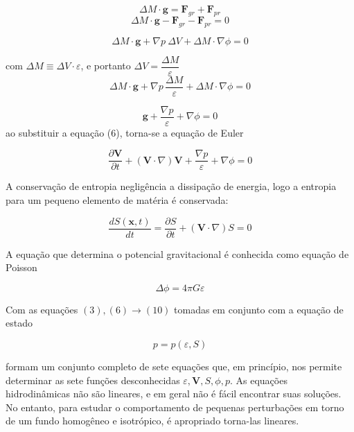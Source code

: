 \documentclass[a4paper,12pt]{article}
\begin{document}
\begin{equation}
	\Delta M \cdot \textbf{g} = \textbf{F}_{gr} + \textbf{F}_{pr}
\end{equation}
\newline
$$\Delta M \cdot \textbf{g} -  \textbf{F}_{gr} - \textbf{F}_{pr} = 0 $$

$$\Delta M \cdot \textbf{g}  + \nabla p \ \Delta V + \Delta M \cdot \nabla \phi=0 $$

com $\Delta M \equiv \Delta V \cdot \varepsilon$, e portanto $\Delta V = \dfrac{\Delta M}{\varepsilon}$
$$\Delta M \cdot \textbf{g}  + \nabla p \,\dfrac{\Delta M}{\varepsilon} + \Delta M \cdot \nabla \phi=0 $$

$$\textbf{g}  + \dfrac{\nabla p}{\varepsilon} + \nabla \phi=0 $$
ao substituir a equação (6), torna-se a equação de Euler

\begin{equation}
	\dfrac{\partial \textbf{V} }{\partial t} + (\textbf{V} \cdot \nabla ) \textbf{V} + \frac{\nabla p}{\varepsilon} + \nabla \phi =0
\end{equation}

A conservação de entropia negligência a dissipação de energia, logo a entropia para um pequeno elemento de matéria é conservada:

\begin{equation}
	\dfrac{dS(\textbf{x},t)}{dt} = \dfrac{\partial S}{\partial t} + ( \textbf{V} \cdot \nabla) S = 0
\end{equation}

A equação que determina o potencial gravitacional é conhecida como equação de Poisson

\begin{equation}
	\Delta\phi = 4\pi G\varepsilon
\end{equation}

Com as equações $(3), (6)\to (10)$ tomadas em conjunto com a equação de estado

\begin{equation}
	p= p(\varepsilon , S)
\end{equation}

formam um conjunto completo de sete equações que, em princípio, nos permite determinar
as sete funções desconhecidas $\varepsilon, \textbf{V}, S, \phi, p$. As equações hidrodinâmicas  não são lineares, e em geral não é fácil encontrar suas soluções. No entanto, para estudar o comportamento de pequenas perturbações em torno de um fundo homogêneo e isotrópico, é apropriado torna-las lineares.
\end{document}
